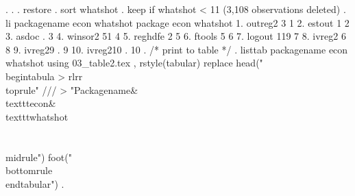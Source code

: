 {\smallskip}
. 
. 
. restore
{\smallskip}
. sort whatshot
{\smallskip}
. keep if whatshot < 11
(3,108 observations deleted)
{\smallskip}
. li packagename econ whatshot
{\smallskip}
     {\TLC}
     {\VBAR} packag{\tytilde}e   econ   whatshot {\VBAR}
     {\LFTT}
  1. {\VBAR}  outreg2      3          1 {\VBAR}
  2. {\VBAR}   estout      1          2 {\VBAR}
  3. {\VBAR}    asdoc      .          3 {\VBAR}
  4. {\VBAR}  winsor2     51          4 {\VBAR}
  5. {\VBAR}  reghdfe      2          5 {\VBAR}
     {\LFTT}
  6. {\VBAR}   ftools      5          6 {\VBAR}
  7. {\VBAR}   logout    119          7 {\VBAR}
  8. {\VBAR}   ivreg2      6          8 {\VBAR}
  9. {\VBAR}  ivreg29      .          9 {\VBAR}
 10. {\VBAR} ivreg210      .         10 {\VBAR}
     {\BLC}
{\smallskip}
. /* print to table */
. listtab packagename  econ whatshot using 03_table2.tex , rstyle(tabular) replace  head("\\begin{\lbr}tabula
> r{\rbr}{\lbr}lrr{\rbr}\\toprule" ///
>             "Packagename\&\\texttt{\lbr}econ{\rbr}\&\\texttt{\lbr}whatshot{\rbr}\\\\\\midrule") foot("\\bottomrule\\end{\lbr}tabular{\rbr}")
{\smallskip}
. 
